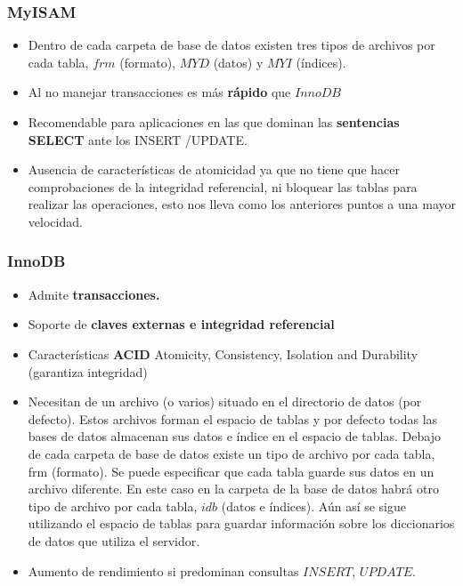 \documentclass[12pt,a4paper]{article}
\begin{document}
\subsubsection{MyISAM} \label{pto311}
\begin{itemize}
\item Dentro de cada carpeta de base de datos existen tres tipos de archivos por cada tabla, $frm$ (formato), $MYD$ (datos) y $MYI$ (índices).

\item Al no manejar transacciones es más \textbf{rápido} que $InnoDB$

\item Recomendable para aplicaciones en las que dominan las \textbf{sentencias SELECT} ante los INSERT /UPDATE.

\item Ausencia de características de atomicidad ya que no tiene que hacer comprobaciones de la integridad referencial, ni bloquear las tablas para realizar las operaciones, esto nos lleva como los anteriores puntos a una mayor velocidad.

\end{itemize}
\subsubsection{InnoDB} \label{pto312}
\begin{itemize}



\item Admite \textbf{transacciones.}

\item Soporte de \textbf{claves externas e integridad referencial}


\item Características \textbf{ACID} Atomicity, Consistency, Isolation and Durability (garantiza integridad)

\item Necesitan de un archivo (o varios) situado en el directorio de datos (por defecto). Estos archivos forman el espacio de tablas y por defecto todas las bases de datos almacenan sus datos e índice en el espacio de tablas. Debajo de cada carpeta de base de datos existe un tipo de archivo por cada tabla, frm (formato). Se puede especificar que cada tabla guarde sus datos en un archivo diferente. En este caso en la carpeta de la base de datos habrá otro tipo de archivo por cada tabla, $idb$ (datos e índices). Aún así se sigue utilizando el espacio de tablas para guardar información sobre los diccionarios de datos que utiliza el servidor. 

\item Aumento de rendimiento si predominan consultas $INSERT$, $UPDATE$.


\end{itemize}
\end{document}
